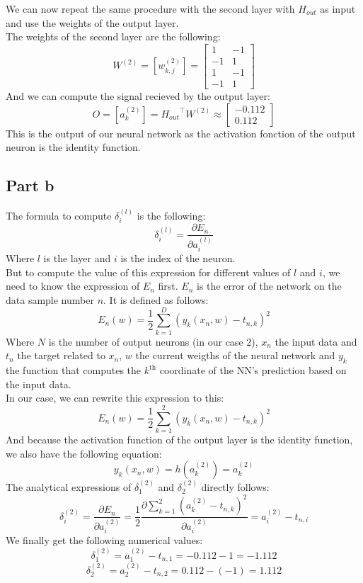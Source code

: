 \documentclass[a4paper, 10pt]{article}
\begin{document}
We can now repeat the same procedure with the second layer with $H_{out}$ as input and 
use the weights of the output layer.
\\
The weights of the second layer are the following:
$$
W^{(2)} = [w_{k,j}^{(2)}] = \begin{bmatrix}
    1 & -1\\
    -1 & 1\\
    1 & -1\\
    -1 & 1
\end{bmatrix}
$$
And we can compute the signal recieved by the output layer:
$$
O = [a_k^{(2)}] = {H_{out}}^\top W^{(2)} \approx \begin{bmatrix}
    -0.112\\
    0.112
\end{bmatrix}
$$
This is the output of our neural network as the activation
fonction of the output neuron is the identity function.

\subsection{Part b}
The formula to compute $\delta_i^{(l)}$ is the following:
$$
\delta_i^{(l)} = \frac{\partial E_n}{\partial a_i^{(l)}}
$$
Where $l$ is the layer and $i$ is the index of the neuron.
\\
But to compute the value of this expression for different values of $l$ and $i$,
we need to know the expression of $E_n$ first. $E_n$ is the error of the network
on the data sample number $n$. It is defined as follows:
$$
E_n(w) = \frac{1}{2} \sum_{k=1}^D ( y_k(x_n,w)-t_{n,k})^2
$$
Where $N$ is the number of output neurons (in our case 2), $x_n$ the input data and 
$t_n$ the target related to $x_n$, $w$ the current weigths of the neural network and 
$y_k$ the function that computes the $k^\text{th}$ coordinate of the NN's prediction based on the input data.
\\
In our case, we can rewrite this expression to this:
$$
E_n(w) = \frac{1}{2} \sum_{k=1}^2( y_k(x_n, w)-t_{n,k})^2
$$
And because the activation function of the output layer is the identity function,
we also have the following equation:
$$
y_k(x_n,w) = h(a_k^{(2)}) = a_k^{(2)}
$$
The analytical expressions of $\delta_1^{(2)}$ and $\delta_2^{(2)}$ directly follows:
$$
\delta_i^{(2)} = \frac{\partial E_n}{\partial a_i^{(2)}} = \frac{1}{2}\frac{\partial  \sum_{k=1}^2( a_k^{(2)}-t_{n,k})^2}{\partial a_i^{(2)}} = a_i^{(2)} - t_{n,i}
$$
We finally get the following numerical values:
$$
\delta_1^{(2)} = a_1^{(2)} - t_{n,1} = -0.112 - 1 = -1.112
$$
$$
\delta_2^{(2)} = a_2^{(2)} - t_{n,2} = 0.112 - (-1) = 1.112
$$
\end{document}
